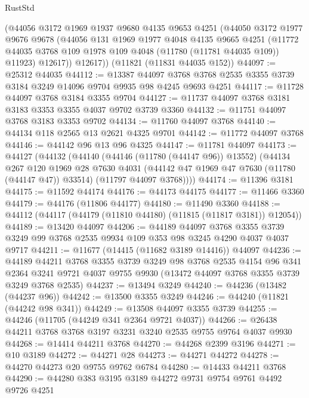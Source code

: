 \begin{lexlean}{RustStd}
\begin{coremodule}
      (@44056
        @3172
        @1969
        @1937
        @9680
        @4135
        @9653
        @4251
        (@44050
          @3172
          @1977
          @9676
          @9678
          (@44056
            @131
            @1969
            @1977
            @4048
            @4135
            @9665
            @4251
            (@11772 @44035 @3768 @109 @1978 @109 @4048 (@11780 (@11781 @44035 @109)) @11923)
            @12617))
        @12617))
    (@11821 (@11831 @44035 @152))
@44097 := @25312 @44035
@44112 := @13387
    @44097
    @3768
    @3768
    @2535
    @3355
    @3739
    @3184
    @3249
    @14096
    @9704
    @9935
    @98
    @4245
    @9693
    @4251
@44117 := @11728 @44097 @3768 @3184 @3355 @9704
@44127 := @11737 @44097 @3768 @3181 @3183 @3353 @3355 @4037 @9702 @3739 @3360
@44132 := @11751 @44097 @3768 @3183 @3353 @9702
@44134 := @11760 @44097 @3768
@44140 := @44134 @118 @2565 @13 @2621 @4325 @9701
@44142 := @11772 @44097 @3768
@44146 := @44142 @96 @13 @96 @4325
@44147 := @11781 @44097
@44173 := @44127
    (@44132
      (@44140
        (@44146 (@11780 (@44147 @96)) @13552)
        (@44134
          @267
          @120
          @1969
          @28
          @7630
          @4031
          (@44142 @47 @1969 @47 @7630 (@11780 (@44147 @47)) @33514)
          (@11797 @44097 @3768))))
@44174 := @11396 @3181
@44175 := @11592 @44174
@44176 := @44173 @44175
@44177 := @11466 @3360
@44179 := @44176 (@11806 @44177)
@44180 := @11490 @3360
@44188 := @44112 (@44117 (@44179 (@11810 @44180) (@11815 (@11817 @3181)) @12054))
@44189 := @13420 @44097
@44206 := @44189
    @44097
    @3768
    @3355
    @3739
    @3249
    @99
    @3768
    @2535
    @9934
    @109
    @353
    @98
    @3245
    @4290
    @4037
    @4037
    @9717
@44211 := @11677 (@14415 (@11682 @3189 @14416)) @44097
@44236 := @44189
    @44211
    @3768
    @3355
    @3739
    @3249
    @98
    @3768
    @2535
    @4154
    @96
    @341
    @2364
    @3241
    @9721
    @4037
    @9755
    @9930
    (@13472 @44097 @3768 @3355 @3739 @3249 @3768 @2535)
@44237 := @13494 @3249
@44240 := @44236 (@13482 (@44237 @96))
@44242 := @13500 @3355 @3249
@44246 := @44240 (@11821 (@44242 @98 @341))
@44249 := @13508 @44097 @3355 @3739
@44255 := @44246 (@11705 (@44249 @341 @2364 @9721 @4037))
@44266 := @26438 @44211 @3768 @3768 @3197 @3231 @3240 @2535 @9755 @9764 @4037 @9930
@44268 := @14414 @44211 @3768
@44270 := @44268 @2399 @3196
@44271 := @10 @3189
@44272 := @44271 @28
@44273 := @44271 @44272
@44278 := @44270 @44273 @20 @9755 @9762 @6784
@44280 := @14433 @44211 @3768
@44290 := @44280 @383 @3195 @3189 @44272 @9731 @9754 @9761 @4492 @9726 @4251

\end{coremodule}
\end{lexlean}
